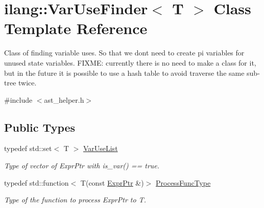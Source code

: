 \hypertarget{classilang_1_1_var_use_finder}{}\section{ilang\+:\+:Var\+Use\+Finder$<$ T $>$ Class Template Reference}
\label{classilang_1_1_var_use_finder}


Class of finding variable uses. So that we don\textquotesingle{}t need to create pi variables for unused state variables. F\+I\+X\+ME\+: currently there is no need to make a class for it, but in the future it is possible to use a hash table to avoid traverse the same sub-\/tree twice.  




{\ttfamily \#include $<$ast\+\_\+helper.\+h$>$}

\subsection*{Public Types}
\begin{DoxyCompactItemize}
\item 
\mbox{\label{classilang_1_1_var_use_finder_ab66effc0aea4f940ad1c7fed68151925}} 
typedef std\+::set$<$ T $>$ \mbox{\hyperlink{classilang_1_1_var_use_finder_ab66effc0aea4f940ad1c7fed68151925}{Var\+Use\+List}}
\begin{DoxyCompactList}\small\item\em Type of vector of Expr\+Ptr with is\+\_\+var() == true. \end{DoxyCompactList}\item 
\mbox{\label{classilang_1_1_var_use_finder_a35047b745828c522532795ff7b45e05f}} 
typedef std\+::function$<$ T(const \mbox{\hyperlink{namespaceilang_a7c4196c72e53ea4df4b7861af7bc3bce}{Expr\+Ptr}} \&)$>$ \mbox{\hyperlink{classilang_1_1_var_use_finder_a35047b745828c522532795ff7b45e05f}{Process\+Func\+Type}}
\begin{DoxyCompactList}\small\item\em Type of the function to process Expr\+Ptr to T. \end{DoxyCompactList}\end{DoxyCompactItemize}
